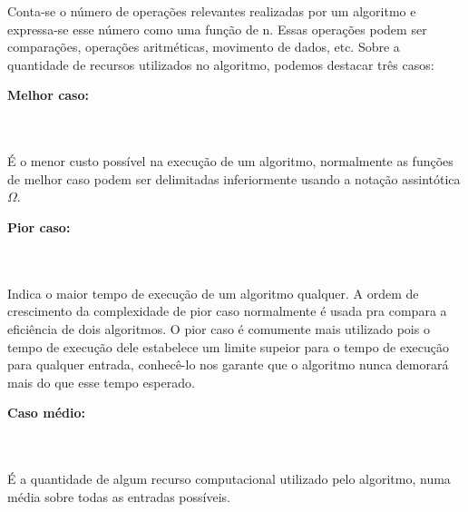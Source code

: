 \documentclass[a4paper, 12pt, fleqn, leqno]{article}
\begin{document}
		Conta-se o número de operações relevantes realizadas por um algoritmo e expressa-se esse número
como uma função de n. Essas operações podem ser comparações, operações aritméticas, movimento de dados, etc. Sobre a quantidade de recursos utilizados no algoritmo, podemos destacar três casos:

			\begin{itemize}
				{\item \bf Melhor caso:}  \\\\
				É o menor custo possível na execução de um algoritmo, normalmente as funções de melhor caso
podem ser delimitadas inferiormente usando a notação assintótica $\Omega$.
				{\item \bf Pior caso:}  \\\\
				Indica o maior tempo de execução de um algoritmo qualquer. A ordem de crescimento da complexidade de pior caso normalmente é usada pra compara a eficiência de dois algoritmos. O pior caso é comumente mais utilizado pois o tempo de execução dele estabelece um limite supeior para o tempo de execução para qualquer entrada, conhecê-lo nos garante que o algoritmo nunca demorará mais do que esse tempo esperado.
				{\item \bf Caso médio:}  \\\\
				É a quantidade de algum recurso computacional utilizado pelo algoritmo, numa média sobre todas as entradas possíveis.
			\end{itemize}
\end{document}
